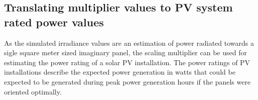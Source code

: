 












\newpage

\subsection{Translating multiplier values to PV system rated power values}
As the simulated irradiance values are an estimation of power radiated towards a sigle square meter sized imaginary panel, the scaling multiplier can be used for estimating the power rating of a solar PV installation. The power ratings of PV installations describe the expected power generation in watts that could be expected to be generated during peak power generation hours if the panels were oriented optimally.

